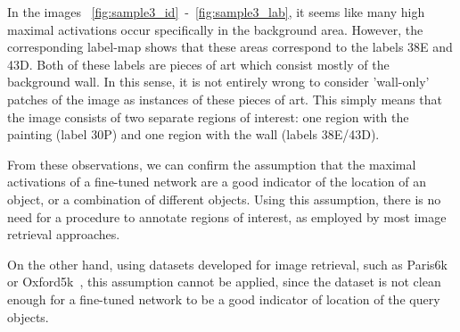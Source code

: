 In the images
~\ref{fig:sample3_id}~-~\ref{fig:sample3_lab}, it seems like many
high maximal activations occur specifically in the background area.
However, the corresponding label-map shows that these areas correspond
to the labels 38E and 43D. Both of these labels are pieces of art which
consist mostly of the background wall. In this sense, it is not
entirely wrong to consider 'wall-only' patches of the image as instances of
these pieces of art. This simply means that the image consists of two
separate regions of interest: one region with the painting (label 30P)
and one region with the wall (labels 38E/43D).

From these observations, we can confirm the assumption that the
maximal activations of a fine-tuned network are a good indicator of
the location of an object, or a combination of different objects.
Using this assumption, there is no need
for a procedure to annotate regions of interest, as employed by most
image retrieval approaches. %

On the other hand, using datasets developed for image retrieval,
such as Paris6k~\cite{philbin_lost_2008} or
Oxford5k~\cite{philbin_object_2007},
this assumption cannot be applied, since the dataset is not clean
enough for a fine-tuned network to be a good indicator of location of
the query objects.

